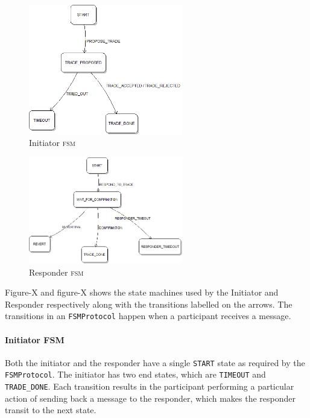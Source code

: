 %
%

\begin{figure}[h!]
	\centering
	\includegraphics[width=0.6\textwidth]{img/protocol-fsm-1.png}
	\caption{Initiator \textsc{fsm}}
	\label{fig:protocol-fsm-1}
\end{figure}

\begin{figure}[h!]
	\centering
	\includegraphics[width=0.6\textwidth]{img/protocol-fsm-2.png}
	\caption{Responder \textsc{fsm}}
	\label{fig:protocol-fsm-2}
\end{figure}

%
%

Figure-X and figure-X shows the state machines used by the Initiator and Responder respectively along with the transitions labelled on the arrows. The transitions in an \texttt{FSMProtocol} happen when a participant receives a message.

\paragraph{Initiator FSM}

Both the initiator and the responder have a single \texttt{START} state as required by the \texttt{FSMProtocol}. The initiator has two end states, which are \texttt{TIMEOUT} and \texttt{TRADE\_DONE}. Each transition results in the participant performing a particular action of sending back a message to the responder, which makes the responder transit to the next state.

